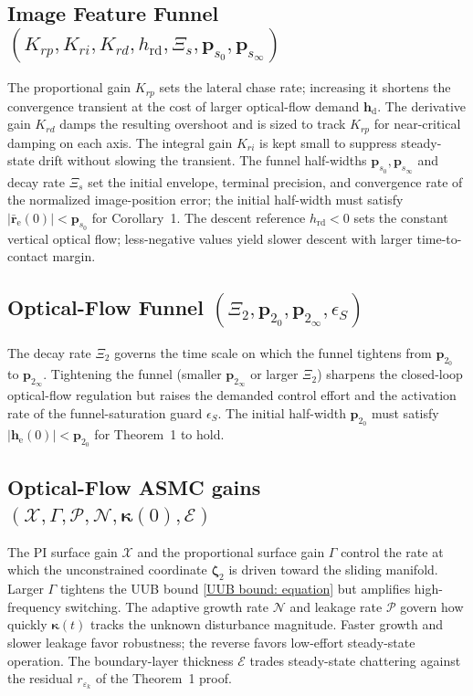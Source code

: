 \documentclass{IEEEtaes}
\begin{document}
\subsection{Image Feature Funnel $(K_{rp}, K_{ri}, K_{rd}, h_\text{rd}, \Xi_s, \boldsymbol{p}_{s_0}, \boldsymbol{p}_{s_\infty})$} The proportional gain $K_{rp}$ sets the lateral chase rate; increasing it shortens the convergence transient at the cost of larger optical-flow demand $\boldsymbol{h}_\text{d}$. The derivative gain $K_{rd}$ damps the resulting overshoot and is sized to track $K_{rp}$ for near-critical damping on each axis. The integral gain $K_{ri}$ is kept small to suppress steady-state drift without slowing the transient. The funnel half-widths $\boldsymbol{p}_{s_0}, \boldsymbol{p}_{s_\infty}$ and decay rate $\Xi_s$ set the initial envelope, terminal precision, and convergence rate of the normalized image-position error; the initial half-width must satisfy $|\bar{\boldsymbol{r}}_\text{e}(0)|<\boldsymbol{p}_{s_0}$ for Corollary~1. The descent reference $h_\text{rd}<0$ sets the constant vertical optical flow; less-negative values yield slower descent with larger time-to-contact margin.

\subsection{Optical-Flow Funnel $(\Xi_2, \boldsymbol{p}_{2_0}, \boldsymbol{p}_{2_\infty}, \epsilon_S)$} The decay rate $\Xi_2$ governs the time scale on which the funnel tightens from $\boldsymbol{p}_{2_0}$ to $\boldsymbol{p}_{2_\infty}$. Tightening the funnel (smaller $\boldsymbol{p}_{2_\infty}$ or larger $\Xi_2$) sharpens the closed-loop optical-flow regulation but raises the demanded control effort and the activation rate of the funnel-saturation guard $\epsilon_S$. The initial half-width $\boldsymbol{p}_{2_0}$ must satisfy $|\boldsymbol{h}_\text{e}(0)|<\boldsymbol{p}_{2_0}$ for Theorem~1 to hold.

\subsection{Optical-Flow ASMC gains $(\mathcal{X}, \Gamma, \mathcal{P}, \mathcal{N}, \boldsymbol{\kappa}(0), \mathcal{E})$} The PI surface gain $\mathcal{X}$ and the proportional surface gain $\Gamma$ control the rate at which the unconstrained coordinate $\boldsymbol{\zeta}_2$ is driven toward the sliding manifold. Larger $\Gamma$ tightens the UUB bound \eqref{UUB bound: equation} but amplifies high-frequency switching. The adaptive growth rate $\mathcal{N}$ and leakage rate $\mathcal{P}$ govern how quickly $\boldsymbol{\kappa}(t)$ tracks the unknown disturbance magnitude. Faster growth and slower leakage favor robustness; the reverse favors low-effort steady-state operation. The boundary-layer thickness $\mathcal{E}$ trades steady-state chattering against the residual $r_{\varepsilon_k}$ of the Theorem~1 proof.
\end{document}
